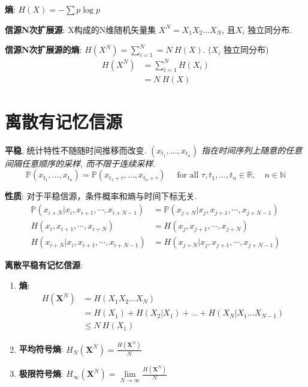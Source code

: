 \documentclass{article}
\newcommand{\env}[2]{\begin{#1}#2\end{#1}}
\newcommand{\defi}[2]{\textbf{#1}, #2}
\newcommand{\bb}{\boldsymbol}
\newcommand{\P}{\mathbb P}
\begin{document}
            
        \textbf{熵}: $H(X) = -\sum p \log p$
        
        \textbf{信源N次扩展源}: X构成的N维随机矢量集 $X^N = X_1 X_2...X_N$, 且$X_i$ 独立同分布.

        \textbf{信源N次扩展源的熵}: $H(X^N) = \sum_{i=1}^N = N\ H(X)$. ($X_i$ 独立同分布)
            \env{align*}{
                H(X^N) 
                &= \sum_{i=1}^N H(X_i)  \tag{$X_i$ 独立}\\
                &= N\ H(X)  \tag{$X_i$ 同分布}
            }
        
    \section{离散有记忆信源}
            
            \defi{平稳}{统计特性不随随时间推移而改变. \textit{$\left(x_{t_1}, \ldots, x_{t_{n}}\right)$ 指在时间序列上随意的任意间隔任意顺序的采样, 而不限于连续采样.}
                $$ \P\left(x_{t_1}, \ldots, x_{t_{n}}\right) = \P\left(x_{t_1+\tau}, \ldots, x_{t_{n}+\tau}\right) \quad \text { for all } \tau, t_1, \ldots, t_{n} \in \mathbb{R}, \quad n \in \mathbb{N}$$
            }
                
                \textbf{性质}: 
                    对于平稳信源，条件概率和熵与时间下标无关.
                        \env{align*}{
                            \P\left(x_{i+N}|x_{i}, x_{i+1}, \cdots, x_{i+N-1}\right) &= \P\left(x_{j+N}|x_{j}, x_{j+1}, \cdots, x_{j+N-1}\right) \tag{条件概率}\\
                            H\left(x_{i}, x_{i+1}, \cdots, x_{i+N}\right) &= H\left(x_{j}, x_{j+1}, \cdots, x_{j+N}\right) \tag{熵}\\
                            H\left(x_{i+N}|x_{i}, x_{i+1}, \cdots, x_{i+N-1}\right) &= H\left(x_{j+N}|x_{j}, x_{j+1}, \cdots, x_{j+N-1}\right) \tag{条件熵}
                        }
                        
            \textbf{离散平稳有记忆信源}:
                \env{enumerate}{
                \item \textbf{熵}:
                    \env{align*}{
                        H(\bb X^N) 
                        &= H(X_1 X_2 ... X_N) \tag{定义}\\
                        &= H(X_1) + H(X_2|X_1) + ... + H(X_N | X_1 ... X_{N-1}) \tag{条件熵展开}\\
                        &\le N\ H(X_1) \tag{熵的不增原理}
                    }
                \item \textbf{平均符号熵}: $H_N(\bb X^N) = \frac{H(\bb X^N)}{N}$
                \item \textbf{极限符号熵}: $H_\infty(\bb X^N) = \lim\limits_{N \to \infty} \frac{H(\bb X^N)}{N}$
                }
                
\end{document}
